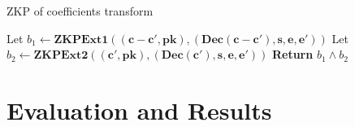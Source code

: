 		\begin{algorithm}
		\caption{ZKP of coefficients transform}\label{alg:ZKPUnpack}
		\begin{algorithmic}[1]
			\State Let $b_1 \gets \mathbf{ZKPExt1((c-c',pk),(Dec(c-c'), s, e, e'))}$
			\State Let $b_2 \gets \mathbf{ZKPExt2((c',pk),(Dec(c'),s,e,e'))}$
			\State \textbf{Return} $b_1 \land b_2$
			\EndProcedure
		\end{algorithmic}
	\end{algorithm}
\section{Evaluation and Results}
\label{sec:5results}


\label{sec:5combineZKP}


